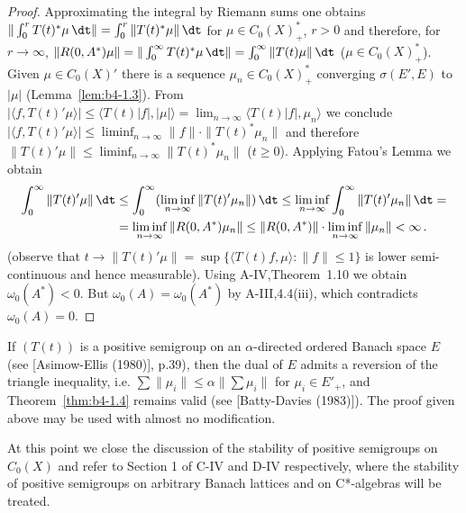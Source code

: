 \begin{proof}
Approximating the integral by Riemann sums one obtains $\|\int_0^r T(t)^*\mu \, \dt\| = \int_0^r \|T(t)^*\mu\| \, \dt$ for $\mu \in C_{0}(X)^*_+$, $r  >  0$ and therefore, for $r \to \infty$, $\|R(0,A^*)\mu\| = \|\int_0^{\infty} T(t)^*\mu \, \dt\| 
 = \int_0^{\infty} \|T(t)\mu\| \, \dt$ 
 ($\mu \in C_{0}(X)_{+}^{*}$). 
Given $\mu \in C_{0}(X)'$ there is a sequence $\mu_n \in C_{0}(X)^*_+$ converging $\sigma(E',E)$ to $|\mu|$ (Lemma~\ref{lem:b4-1.3}).
From $|\langle f,T(t)'\mu \rangle| \leq \langle T(t)|f|,|\mu| \rangle = \lim_{n\to\infty} \langle T(t)|f|,\mu_n \rangle$ we conclude $|\langle f,T(t)'\mu \rangle| \leq \liminf_{n\to\infty}\|f\| \cdot \|T(t)^*\mu_n\|$ and therefore $\|T(t)'\mu\| \leq \liminf_{n\to\infty}\|T(t)^*\mu_n\|$ ($t \geq 0$). 
Applying Fatou's Lemma we obtain 
\[
\begin{aligned}
	\int_0^{\infty} \|T(t)'\mu\| \, \dt &\leq \int_0^{\infty} (\liminf_{n\to\infty} \|T(t)'\mu_n\|) \, \dt \leq  
	\liminf_{n\to\infty} \int_0^{\infty} \|T(t)'\mu_n\| \, \dt = \\ 
	& = \liminf_{n\to\infty} \|R(0,A^{*})\mu_n\| \leq \|R(0,A^{*})\|\cdot\liminf_{n\to\infty} \|\mu_n\| < \infty\,.
\end{aligned}
\]
(observe that $t \to \|T(t)'\mu\| = \sup \{\langle T(t)f,\mu \rangle \colon \|f\| \leq 1\}$ is lower semi-continuous and hence measurable). 
Using A-IV,Theorem~1.10 we obtain $\omega_{0}(A^{*})<0$. But $\omega_{0}(A) = \omega_{0}(A^{*})$ by A-III,4.4(iii), which contradicts $\omega_{0}(A) = 0$.
\end{proof}

\begin{remark}\label{rem:b4-1.5}
If $(T(t))$ is a positive semigroup on an $\alpha$-directed ordered Banach space $E$ (see [Asimow-Ellis (1980)], p.39), 
then the dual of $E$ admits a reversion of the triangle inequality, 
i.e. $\sum\|\mu_i\| \leq \alpha\|\sum\mu_i\|$ 
for $\mu_i \in E'_+$, 
and Theorem~\ref{thm:b4-1.4} remains valid (see [Batty-Davies (1983)]). 
The proof given above may be used with almost no modification.
\end{remark}

At this point we close the discussion of the stability of positive semigroups on $C_{0}(X)$ and refer to Section 1 of C-IV and D-IV respectively, where the stability of positive semigroups on arbitrary Banach lattices and on C*-algebras will be treated.
%
%
\newpage
%
